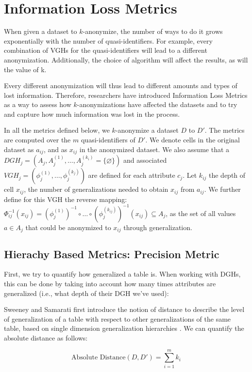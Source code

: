 \section{Information Loss Metrics}
\label{sec:metrics}
When given a dataset to $k$-anonymize, the number of ways to do it grows exponentially with the number of quasi-identifiers. For example, every combination of VGHs for the quasi-identifiers will lead to a different anonymization. Additionally, the choice of algorithm will affect the results, as will the value of k.

Every different anonymization will thus lead to different amounts and types of lost information. Therefore, researchers have introduced Information Loss Metrics as a way to assess how $k$-anonymizations have affected the datasets and to try and capture how much information was lost in the process.

In all the metrics defined below, we $k$-anonymize a dataset $D$ to $D'$. The metrics are computed over the $m$ quasi-identifiers of $D'$. We denote cells in the original dataset as $a_{ij}$, and as $x_{ij}$ in the anonymized dataset. We also assume that a $DGH_j = \left(A_j, A_j^{(1)}, \dots, A_j^{(k_i)} = \{\varnothing\}\right)$ and associated $VGH_j = \left(\phi_j^{(1)}, \dots, \phi_j^{(k_j)}\right)$ are defined for each attribute $c_j$. 
Let $k_{ij}$ the depth of cell $x_{ij}$, the number of generalizations needed to obtain $x_{ij}$ from $a_{ij}$.
We further define for this VGH the reverse mapping: $\Phi^{-1}_{ij}(x_{ij}) = (\phi_{j}^{(1)})^{-1}\circ\dots\circ(\phi_{j}^{(k_{ij})})^{-1}(x_{ij}) \subseteq A_j$, as the set of all values $a \in A_j$ that could be anonymized to $x_{ij}$ through generalization. 

\subsection{Hierachy Based Metrics: Precision Metric}
\label{metrics_prec}
First, we try to quantify how generalized a table is. When working with DGHs, this can be done by taking into account how many times attributes are generalized (i.e., what depth of their DGH we've used):

Sweeney and Samarati first introduce the notion of distance to describe the level of generalization of a table with respect to other generalizations of the same table, based on single dimension generalization hierarchies \cite{distance_metrics}. We can quantify the absolute distance as follows:

$$
\mbox{Absolute Distance}(D, D') = \sum_{i=1}^m k_i
\label{abs_dist}
$$

